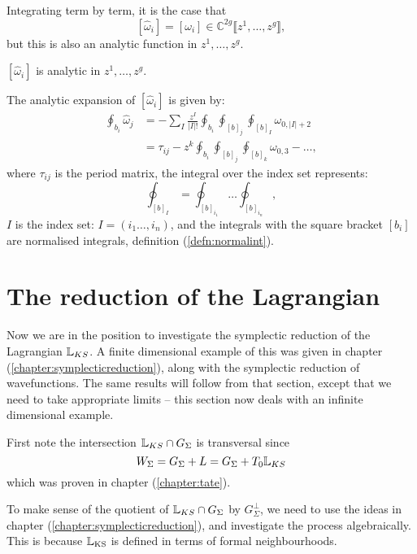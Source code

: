     Integrating term by term, it is the case that  
    \[ [\widehat{\omega}_i]= [\omega_i] \in \mathbb{C}^{2g} \lBrack z^1,\dots,z^g \rBrack, 
    \] but this is also an analytic function in \(z^1,\dots,z^g\). 
    \begin{lem}
     \([\widehat{\omega}_i] \) is analytic in \(z^1,\dots ,z^g\).
    \end{lem}
    The analytic expansion of \( [\widehat{\omega}_i]\) is given by:
    \begin{align*}
   \oint_{b_i}\widehat{\omega}_j&=-\sum_{I}\frac{z^I}{|I|!}\oint_{b_i}\oint_{[b]_j}\oint_{[b]_I}\omega_{0,|I|+2}\\
   &=\tau_{ij}-z^k\oint_{b_i}\oint_{[b]_j}\oint_{[b]_k}\omega_{0,3}- \dots ,
    \end{align*}
    where \( \tau_{ij}\) is the period matrix, the integral over the index set represents:
    \[ \oint_{[b]_I}=\oint_{[b]_{i_1}}\dots \oint_{[b]_{i_n}}, \] 
    \(I\) is the index set: \(I=(i_1\dots,i_n)\), and the integrals with the square bracket \( [b_i]\) are normalised integrals, definition (\ref{defn:normalint}). 
    
    
    \section{The reduction of the Lagrangian}
    \label{sec:Breduction}
    Now we are in the position to investigate the symplectic reduction of the Lagrangian \( \mathbb{L}_{KS}\). A finite dimensional example of this was given in chapter (\ref{chapter:symplecticreduction}), along with the symplectic reduction of wavefunctions. The same results will follow from that section, except that we need to take appropriate limits -- this section now deals with an infinite dimensional example.
    
    First note the intersection \(\mathbb{L}_{KS} \cap G_\Sigma\) is transversal since \[ W_\Sigma =G_\Sigma+L=G_\Sigma+T_0\mathbb{L}_{KS}\] which was proven in chapter (\ref{chapter:tate}).
    
    To make sense of the quotient of \(\mathbb{L}_{KS}\cap G_\Sigma\) by \(G_\Sigma^\perp\), we need to use the ideas in chapter (\ref{chapter:symplecticreduction}), and investigate the process algebraically. This is because \(\mathbb{L}_{\text{KS}}\) is defined in terms of formal neighbourhoods.
    
